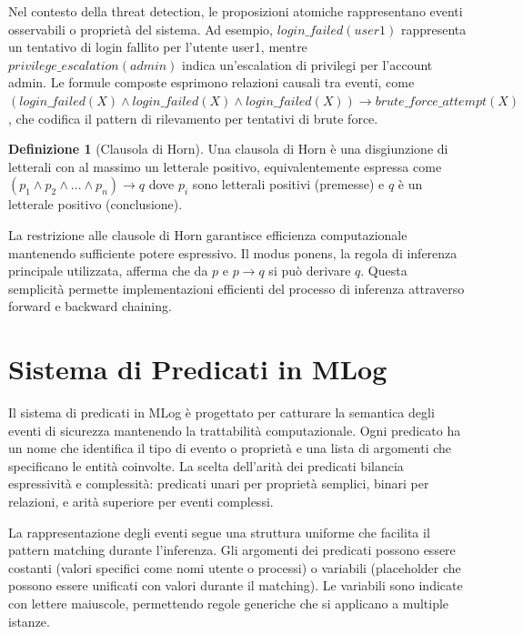 \documentclass[12pt,a4paper]{report}
\theoremstyle{definition}
\newtheorem{definizione}{Definizione}[chapter]
\begin{document}
Nel contesto della threat detection, le proposizioni atomiche rappresentano eventi osservabili o proprietà del sistema. Ad esempio, $login\_failed(user1)$ rappresenta un tentativo di login fallito per l'utente user1, mentre $privilege\_escalation(admin)$ indica un'escalation di privilegi per l'account admin. Le formule composte esprimono relazioni causali tra eventi, come $(login\_failed(X) \land login\_failed(X) \land login\_failed(X)) \rightarrow brute\_force\_attempt(X)$, che codifica il pattern di rilevamento per tentativi di brute force.

\begin{definizione}[Clausola di Horn]
Una clausola di Horn è una disgiunzione di letterali con al massimo un letterale positivo, equivalentemente espressa come $(p_1 \land p_2 \land ... \land p_n) \rightarrow q$ dove $p_i$ sono letterali positivi (premesse) e $q$ è un letterale positivo (conclusione).
\end{definizione}

La restrizione alle clausole di Horn garantisce efficienza computazionale mantenendo sufficiente potere espressivo. Il modus ponens, la regola di inferenza principale utilizzata, afferma che da $p$ e $p \rightarrow q$ si può derivare $q$. Questa semplicità permette implementazioni efficienti del processo di inferenza attraverso forward e backward chaining.

\section{Sistema di Predicati in MLog}

Il sistema di predicati in MLog è progettato per catturare la semantica degli eventi di sicurezza mantenendo la trattabilità computazionale. Ogni predicato ha un nome che identifica il tipo di evento o proprietà e una lista di argomenti che specificano le entità coinvolte. La scelta dell'arità dei predicati bilancia espressività e complessità: predicati unari per proprietà semplici, binari per relazioni, e arità superiore per eventi complessi.

La rappresentazione degli eventi segue una struttura uniforme che facilita il pattern matching durante l'inferenza. Gli argomenti dei predicati possono essere costanti (valori specifici come nomi utente o processi) o variabili (placeholder che possono essere unificati con valori durante il matching). Le variabili sono indicate con lettere maiuscole, permettendo regole generiche che si applicano a multiple istanze.
\end{document}
